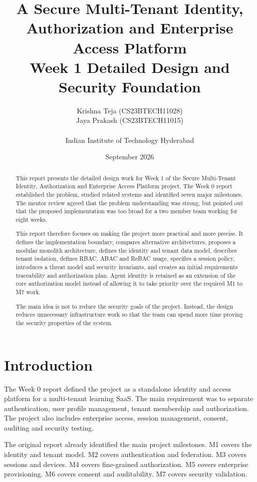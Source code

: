 \documentclass[11pt,a4paper]{article}
\title{A Secure Multi-Tenant Identity, Authorization and Enterprise Access Platform\\
\large Week 1 Detailed Design and Security Foundation}
\author{
Krishna Teja (CS23BTECH11028)\\
Jaya Prakash (CS23BTECH11015)\\
\\
Indian Institute of Technology Hyderabad
}
\date{September 2026}
\begin{document}
\maketitle
\thispagestyle{empty}

\begin{abstract}
This report presents the detailed design work for Week 1 of the Secure Multi-Tenant Identity, Authorization and Enterprise Access Platform project. The Week 0 report established the problem, studied related systems and identified seven major milestones. The mentor review agreed that the problem understanding was strong, but pointed out that the proposed implementation was too broad for a two member team working for eight weeks.

This report therefore focuses on making the project more practical and more precise. It defines the implementation boundary, compares alternative architectures, proposes a modular monolith architecture, defines the identity and tenant data model, describes tenant isolation, defines RBAC, ABAC and ReBAC usage, specifies a session policy, introduces a threat model and security invariants, and creates an initial requirements traceability and authorization plan. Agent identity is retained as an extension of the core authorization model instead of allowing it to take priority over the required M1 to M7 work.

The main idea is not to reduce the security goals of the project. Instead, the design reduces unnecessary infrastructure work so that the team can spend more time proving the security properties of the system.
\end{abstract}

\newpage
\tableofcontents
\newpage

\section{Introduction}

The Week 0 report defined the project as a standalone identity and access platform for a multi-tenant learning SaaS. The main requirement was to separate authentication, user profile management, tenant membership and authorization. The project also includes enterprise access, session management, consent, auditing and security testing.

The original report already identified the main project milestones. M1 covers the identity and tenant model. M2 covers authentication and federation. M3 covers sessions and devices. M4 covers fine-grained authorization. M5 covers enterprise provisioning. M6 covers consent and auditability. M7 covers security validation.
\end{document}
